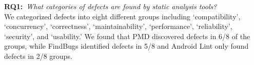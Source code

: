 \documentclass{sig-alternate}
\newcommand{\todo}[1]{\textcolor{cyan}{\textbf{[#1]}}}
\begin{document}

%



\textbf{RQ1:}~\emph{What categories of defects are found by static analysis tools?}\\
We categorized defects into eight different groups including `compatibility', `concurrency', `correctness', `maintainability', `performance', `reliability', `security', and `usability.' We found that PMD discovered defects in 6/8 of the groups, while FindBugs identified defects in 5/8 and Android Lint only found defects in 2/8 groups. \\





\end{document}
